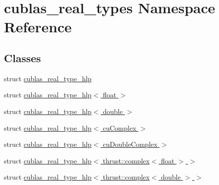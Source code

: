 \hypertarget{namespacecublas__real__types}{\section{cublas\-\_\-real\-\_\-types Namespace Reference}
\label{namespacecublas__real__types}
}
\subsection*{Classes}
\begin{DoxyCompactItemize}
\item 
struct \hyperlink{structcublas__real__types_1_1cublas__real__type__hlp}{cublas\-\_\-real\-\_\-type\-\_\-hlp}
\item 
struct \hyperlink{structcublas__real__types_1_1cublas__real__type__hlp_3_01float_01_4}{cublas\-\_\-real\-\_\-type\-\_\-hlp$<$ float $>$}
\item 
struct \hyperlink{structcublas__real__types_1_1cublas__real__type__hlp_3_01double_01_4}{cublas\-\_\-real\-\_\-type\-\_\-hlp$<$ double $>$}
\item 
struct \hyperlink{structcublas__real__types_1_1cublas__real__type__hlp_3_01cuComplex_01_4}{cublas\-\_\-real\-\_\-type\-\_\-hlp$<$ cu\-Complex $>$}
\item 
struct \hyperlink{structcublas__real__types_1_1cublas__real__type__hlp_3_01cuDoubleComplex_01_4}{cublas\-\_\-real\-\_\-type\-\_\-hlp$<$ cu\-Double\-Complex $>$}
\item 
struct \hyperlink{structcublas__real__types_1_1cublas__real__type__hlp_3_01thrust_1_1complex_3_01float_01_4_01_4}{cublas\-\_\-real\-\_\-type\-\_\-hlp$<$ thrust\-::complex$<$ float $>$ $>$}
\item 
struct \hyperlink{structcublas__real__types_1_1cublas__real__type__hlp_3_01thrust_1_1complex_3_01double_01_4_01_4}{cublas\-\_\-real\-\_\-type\-\_\-hlp$<$ thrust\-::complex$<$ double $>$ $>$}
\end{DoxyCompactItemize}
